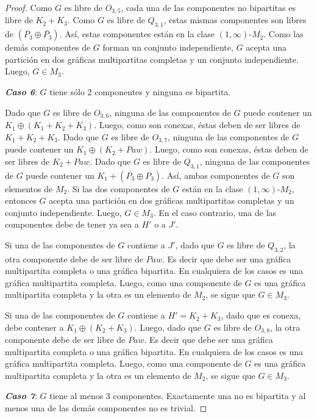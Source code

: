 \begin{proof}
Como $G$ es libre de $O_{3,5}$, cada una de las componentes no bipartitas es libre de $K_2+K_3$. Como $G$ es libre de $Q_{3,1}$, estas mismas componentes son libres de $(\overline{P_3}\oplus\overline{P_3})$. Así, estas componentes están en la clase $(1,\infty)$-$M_2$. Como las demás componentes de $G$ forman un conjunto independiente, $G$ acepta una partición en dos gráficas multipartitas completas y un conjunto independiente. Luego, $G\in M_3$.

\emph{\textbf{Caso 6}}: $G$ tiene sólo 2 componentes y ninguna es bipartita.
   
Dado que $G$ es libre de $O_{3,6}$, ninguna de las componentes de $G$ puede contener un $K_1\oplus (K_1+K_2+K_3)$. Luego, como son conexas, éstas deben de ser libres de $K_1+K_2+K_3$. Dado que $G$ es libre de $O_{3,7}$, ninguna de las componentes de $G$ puede contener un $K_1\oplus (K_2+Paw)$. Luego, como son conexas, éstas deben de ser libres de $K_2+Paw$. Dado que $G$ es libre de $Q_{3,1}$, ninguna de las componentes de $G$ puede contener un $K_1 + (\overline{P_3}\oplus\overline{P_3})$. Así, ambas componentes de $G$ son elementos de $M_2$. Si las dos componentes de $G$ están en la clase $(1,\infty)$-$M_2$, entonces $G$ acepta una partición en dos gráficas multipartitas completas y un conjunto independiente. Luego, $G\in M_3$. En el caso contrario, una de las componentes debe de tener ya sea a $H'$ o a $J'$. 

Si una de las componentes de $G$ contiene a $J'$, dado que $G$ es libre de $Q_{3,2}$, la otra componente debe de ser libre de $Paw$. Es decir que debe ser una gráfica multipartita completa o una gráfica bipartita. En cualquiera de los casos es una gráfica multipartita completa. Luego, como una componente de $G$ es una gráfica multipartita completa y la otra es un elemento de $M_2$, se sigue que $G\in M_3$.

Si una de las componentes de $G$ contiene a $H'=K_2+K_3$, dado que es conexa, debe contener a $K_1\oplus(K_2+K_3)$. Luego, dado que $G$ es libre de $O_{3,8}$, la otra componente debe de ser libre de $Paw$. Es decir que debe ser una gráfica multipartita completa o una gráfica bipartita. En cualquiera de los casos es una gráfica multipartita completa. Luego, como una componente de $G$ es una gráfica multipartita completa y la otra es un elemento de $M_2$, se sigue que $G\in M_3$.

\emph{\textbf{Caso 7}}: $G$ tiene al menos 3 componentes. Exactamente una no es bipartita y al menos una de las demás componentes no es trivial.


\end{proof}
